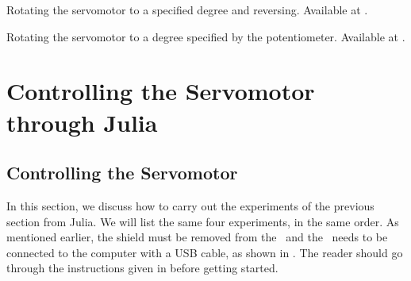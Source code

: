 \begin{pycode}
   {Rotating
    the servomotor to a specified degree and reversing.  Available at
    .}
  \label{py:servo-reverse}
  
\end{pycode}

\begin{pycode}
  \label{py:servo-loop}
  
\end{pycode}

\begin{pycode}
   {Rotating the servomotor to a degree specified by
    the potentiometer.  Available at .}
  \label{py:servo-pot}
  
\end{pycode}

\section{Controlling the Servomotor through Julia}
\subsection{Controlling the Servomotor}
\label{sec:servo-julia}
In this section, we discuss how to carry out the experiments of the
previous section from Julia.  We will list the same four experiments,
in the same order. As mentioned earlier, the shield must be removed from 
the \arduino\ and the \arduino\ needs to be connected to the computer 
with a USB cable, as shown in . 
The reader should go through the instructions given in  before getting started.


